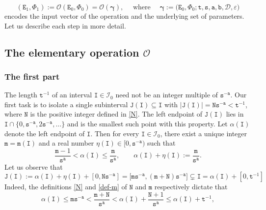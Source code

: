 \documentclass[12pt, twoside]{article}
\theoremstyle{definition}
\numberwithin{equation}{section}
\begin{document}
\begin{equation} \label{O-def} 
(\mathtt E_1, \Phi_1) := \mathscr{O}(\mathtt E_0, \Phi_0) = \mathscr{O}(\pmb{\gamma}), \quad \text{ where } \quad \pmb{\gamma} := \bigl(\mathtt E_0, \Phi_0; \mathtt t, \mathtt s, \mathtt a, \mathtt b, \mathscr{D}, \varepsilon \bigr)
\end{equation} 
encodes the input vector of the operation and the underlying set of parameters. Let us describe each step in more detail. 
\subsection{The elementary operation $\mathscr{O}$} \label{O-description-section}
\subsubsection{The first part}
The length $\mathtt t^{-1}$ of an interval $\mathtt I \in \mathscr{I}_0$ need not be an integer multiple of $\mathtt s^{-\mathtt a}$. Our first task is to isolate a single subinterval $\mathtt J(\mathtt I) \subseteq \mathtt I$ with $|\mathtt J(\mathtt I)| = \mathtt N \mathtt s^{- \mathtt a} < \mathtt t^{-1}$,  where $\mathtt N$ is the positive integer defined in \eqref{N}. The left endpoint of $\mathtt J(\mathtt I)$ lies in $\mathtt I \cap \{0, \mathtt s^{-\mathtt a}, 2 \mathtt s^{-\mathtt a}, \ldots \}$ and is the smallest such point with this property. Let $\alpha(\mathtt I)$ denote the left endpoint of $\mathtt I$. Then for every $\mathtt I \in \mathscr{I}_0$, there exist a unique integer $\mathtt m = \mathtt m(\mathtt I)$ and a real number  $\eta(\mathtt I) \in [0, \mathtt s^{-\mathtt a})$ such that 
\begin{equation} \label{def-m}
\frac{\mathtt m-1}{\mathtt s^{\mathtt a}} < \alpha(\mathtt I) \leq \frac{\mathtt m}{\mathtt s^{\mathtt a}}, \qquad \alpha(\mathtt I) + \eta(\mathtt I) := \frac{\mathtt m}{\mathtt s^{\mathtt a}}.
\end{equation} 
Let us observe that 
\begin{equation} 
\label{step-1-inclusion} 
\mathtt J(\mathtt I) := \alpha(\mathtt I) + \eta(\mathtt I) + [0, \mathtt N \mathtt s^{-\mathtt a}] = \bigl[ \mathtt m \mathtt s^{-\mathtt a}, (\mathtt m+\mathtt N) \mathtt s^{-\mathtt a} \bigr] \subsetneq \mathtt I = \alpha(\mathtt I) + [0, \mathtt t^{-1}]
\end{equation} 
Indeed, the definitions \eqref{N} and \eqref{def-m} of $\mathtt N$ and $\mathtt m$ respectively dictate that 
\[ \alpha(\mathtt I) \leq \mathtt m \mathtt s^{-\mathtt a} < \frac{\mathtt m+ \mathtt N}{\mathtt s^{\mathtt a}} < \alpha(\mathtt I) + \frac{\mathtt N + 1}{\mathtt s^{\mathtt a}} \leq \alpha(\mathtt I) + \mathtt t^{-1}, \] 
\end{document}
